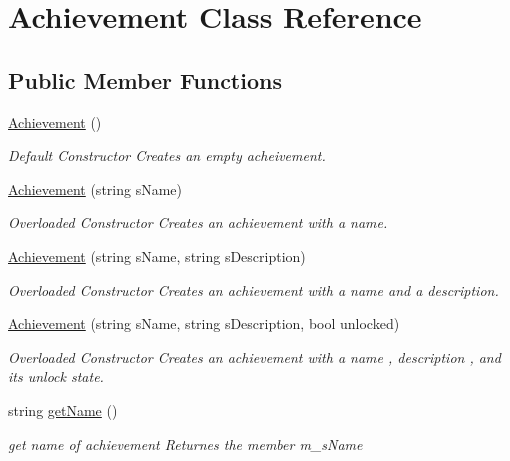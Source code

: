 \hypertarget{class_achievement}{}\section{Achievement Class Reference}
\label{class_achievement}
\subsection*{Public Member Functions}
\begin{DoxyCompactItemize}
\item 
\hypertarget{class_achievement_acea9a90b8128628e1bddc45a83afaa99}{}\label{class_achievement_acea9a90b8128628e1bddc45a83afaa99} 
\hyperlink{class_achievement_acea9a90b8128628e1bddc45a83afaa99}{Achievement} ()
\begin{DoxyCompactList}\small\item\em Default Constructor Creates an empty acheivement. \end{DoxyCompactList}\item 
\hyperlink{class_achievement_ad36246aeeae27b2e82a3a6d259cd483d}{Achievement} (string s\+Name)
\begin{DoxyCompactList}\small\item\em Overloaded Constructor Creates an achievement with a name. \end{DoxyCompactList}\item 
\hyperlink{class_achievement_ac3d729e601b49f195f671e93422159f5}{Achievement} (string s\+Name, string s\+Description)
\begin{DoxyCompactList}\small\item\em Overloaded Constructor Creates an achievement with a name and a description. \end{DoxyCompactList}\item 
\hyperlink{class_achievement_a83be456772eb1bb65ba8414111b34040}{Achievement} (string s\+Name, string s\+Description, bool unlocked)
\begin{DoxyCompactList}\small\item\em Overloaded Constructor Creates an achievement with a name , description , and its unlock state. \end{DoxyCompactList}\item 
\hypertarget{class_achievement_a83cf7bc45be0c270636f230cf6e6334d}{}\label{class_achievement_a83cf7bc45be0c270636f230cf6e6334d} 
string \hyperlink{class_achievement_a83cf7bc45be0c270636f230cf6e6334d}{get\+Name} ()
\begin{DoxyCompactList}\small\item\em get name of achievement Returnes the member m\+\_\+s\+Name \end{DoxyCompactList}\item 

\end{DoxyCompactItemize}

